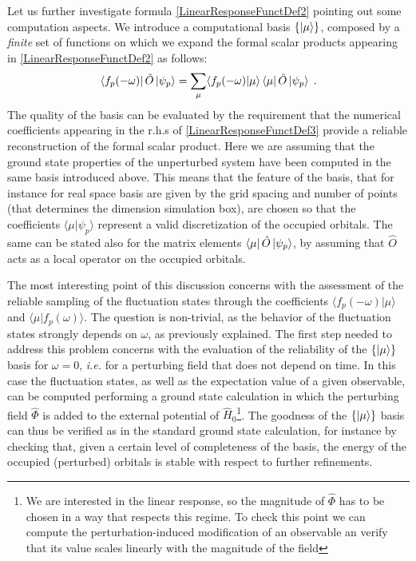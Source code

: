 \documentclass[a4paper]{article}
\newcommand{\be}{\begin{equation}}
\newcommand{\ee}{\end{equation}}
\newcommand{\lb}{\label}
\newcommand{\op}[1]{\hat {#1}}
\newcommand{\brket}[2]{\langle  #1 | #2 \rangle} %
\newcommand{\hnot}{\op{H}_0}
\begin{document}
Let us further investigate formula \eqref{LinearResponseFunctDef2} pointing out some computation aspects. We introduce a computational basis $\{\ket{\mu}\}$, composed by a \emph{finite}
set of functions on which we expand the formal scalar products appearing in \eqref{LinearResponseFunctDef2} as follows:
\be\lb{LinearResponseFunctDef3}
\bra{f_p(-\omega)}\op O\ket{\psi_p} = \sum_\mu \brket{f_p(-\omega)}{\mu}\bra{\mu}\op O\ket{\psi_p} \;.
\ee
The quality of the basis can be evaluated by the requirement that the numerical coefficients appearing in the r.h.s of \eqref{LinearResponseFunctDef3} provide a reliable reconstruction 
of the formal scalar product. Here we are assuming that the ground state properties of the unperturbed system have been computed in the same basis introduced above. This means that the 
feature of the basis, that for instance for real space basis are given by the grid spacing and number of points (that determines the dimension simulation box), are chosen so that the 
coefficients $\brket{\mu}{\psi_p}$ represent a valid discretization of the occupied orbitals. The same can be stated also for the matrix elements $\bra{\mu}\op O\ket{\psi_p}$, by assuming 
that $\op O$ acts as a local operator on the occupied orbitals. 

The most interesting point of this discussion concerns with the assessment of the reliable sampling of the fluctuation states through the coefficients $\brket{f_p(-\omega)}{\mu}$ and
$\brket{\mu}{f_p(\omega)}$. The question is non-trivial, as the behavior of the fluctuation states strongly depends on $\omega$, as previously explained.
The first step needed to address this problem concerns with the evaluation of the reliability of the $\{\ket{\mu}\}$ basis for $\omega=0$, \emph{i.e.} for a perturbing field that does 
not depend on time. In this case the fluctuation states, as well as the expectation value of a given observable, can be computed performing a ground state calculation in which the perturbing 
field $\op\Phi$ is added to the external potential of $\hnot$\footnote{We are interested in the linear response, so the magnitude of $\op\Phi$ has to be chosen in a way that respects this 
regime. To check this point we can compute the perturbation-induced modification of an observable an verify that its value scales linearly with the magnitude of the field}. 
The goodness of the $\{\ket{\mu}\}$ basis can thus be verified as in the standard ground state calculation, for instance by checking that, given a certain level of completeness of the basis,
the energy of the occupied (perturbed) orbitals is stable with respect to further refinements. 
\end{document}
